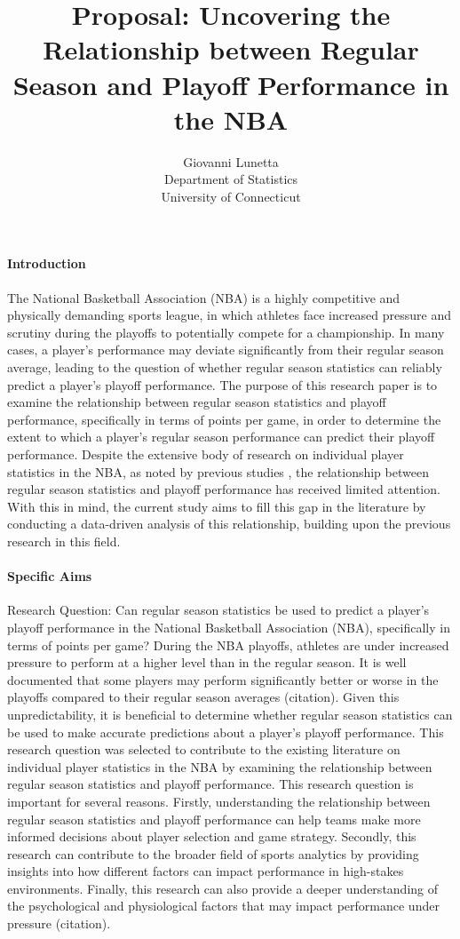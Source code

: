 \documentclass[12pt]{article}
\title{Proposal: Uncovering the Relationship between Regular Season and Playoff Performance in the NBA}
\author{Giovanni Lunetta\\
  Department of Statistics\\
  University of Connecticut
}
\begin{document}
\maketitle


\paragraph{Introduction}
The National Basketball Association (NBA) is a highly competitive and physically demanding sports league, in which athletes face increased pressure and scrutiny during the playoffs to potentially compete for a championship. In many cases, a player's performance may deviate significantly from their regular season average, leading to the question of whether regular season statistics can reliably predict a player's playoff performance. The purpose of this research paper is to examine the relationship between regular season statistics and playoff performance, specifically in terms of points per game, in order to determine the extent to which a player's regular season performance can predict their playoff performance. Despite the extensive body of research on individual player statistics in the NBA, as noted by previous studies \citep{8756733}, the relationship between regular season statistics and playoff performance has received limited attention. With this in mind, the current study aims to fill this gap in the literature by conducting a data-driven analysis of this relationship, building upon the previous research \citep{BaumeisterRoyF1986Arop} in this field.

\paragraph{Specific Aims}
Research Question:
Can regular season statistics be used to predict a player's playoff performance in the National Basketball Association (NBA), specifically in terms of points per game? During the NBA playoffs, athletes are under increased pressure to perform at a higher level than in the regular season. It is well documented that some players may perform significantly better or worse in the playoffs compared to their regular season averages (citation). Given this unpredictability, it is beneficial to determine whether regular season statistics can be used to make accurate predictions about a player's playoff performance. This research question was selected to contribute to the existing literature on individual player statistics in the NBA by examining the relationship between regular season statistics and playoff performance. This research question is important for several reasons. Firstly, understanding the relationship between regular season statistics and playoff performance can help teams make more informed decisions about player selection and game strategy. Secondly, this research can contribute to the broader field of sports analytics by providing insights into how different factors can impact performance in high-stakes environments. Finally, this research can also provide a deeper understanding of the psychological and physiological factors that may impact performance under pressure (citation).
\end{document}
